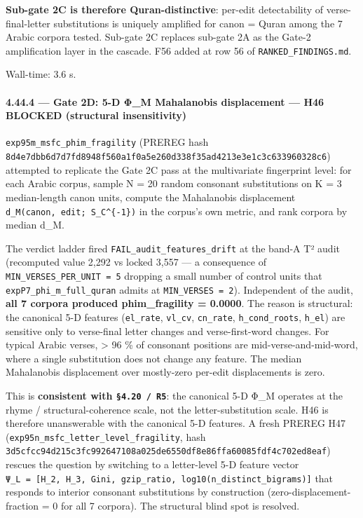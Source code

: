 \documentclass[
]{article}
\begin{document}
\textbf{Sub-gate 2C is therefore Quran-distinctive}: per-edit
detectability of verse-final-letter substitutions is uniquely amplified
for canon = Quran among the 7 Arabic corpora tested. Sub-gate 2C
replaces sub-gate 2A as the Gate-2 amplification layer in the cascade.
F56 added at row 56 of \texttt{RANKED\_FINDINGS.md}.

Wall-time: 3.6 s.

\paragraph{4.44.4 --- Gate 2D: 5-D Φ\_M Mahalanobis displacement --- H46
BLOCKED (structural
insensitivity)}\label{gate-2d-5-d-ux3c6_m-mahalanobis-displacement-h46-blocked-structural-insensitivity}

\texttt{exp95m\_msfc\_phim\_fragility} (PREREG hash
\texttt{8d4e7dbb6d7d7fd8948f560a1f0a5e260d338f35ad4213e3e1c3c633960328c6})
attempted to replicate the Gate 2C pass at the multivariate fingerprint
level: for each Arabic corpus, sample N = 20 random consonant
substitutions on K = 3 median-length canon units, compute the
Mahalanobis displacement \texttt{d\_M(canon,\ edit;\ S\_C\^{}\{-1\})} in
the corpus's own metric, and rank corpora by median d\_M.

The verdict ladder fired \texttt{FAIL\_audit\_features\_drift} at the
band-A T² audit (recomputed value 2,292 vs locked 3,557 --- a
consequence of \texttt{MIN\_VERSES\_PER\_UNIT\ =\ 5} dropping a small
number of control units that \texttt{expP7\_phi\_m\_full\_quran} admits
at \texttt{MIN\_VERSES\ =\ 2}). Independent of the audit, \textbf{all 7
corpora produced phim\_fragility = 0.0000}. The reason is structural:
the canonical 5-D features (\texttt{el\_rate}, \texttt{vl\_cv},
\texttt{cn\_rate}, \texttt{h\_cond\_roots}, \texttt{h\_el}) are
sensitive only to verse-final letter changes and verse-first-word
changes. For typical Arabic verses, \textgreater{} 96 \% of consonant
positions are mid-verse-and-mid-word, where a single substitution does
not change any feature. The median Mahalanobis displacement over
mostly-zero per-edit displacements is zero.

This is \textbf{consistent with \texttt{§4.20\ /\ R5}}: the canonical
5-D Φ\_M operates at the rhyme / structural-coherence scale, not the
letter-substitution scale. H46 is therefore unanswerable with the
canonical 5-D features. A fresh PREREG H47
(\texttt{exp95n\_msfc\_letter\_level\_fragility}, hash
\texttt{3d5cfcc94d215c3fc992647108a025de6550df8e86ffa60085fdf4c702ed8eaf})
rescues the question by switching to a letter-level 5-D feature vector
\texttt{Ψ\_L\ =\ {[}H\_2,\ H\_3,\ Gini,\ gzip\_ratio,\ log10(n\_distinct\_bigrams){]}}
that responds to interior consonant substitutions by construction
(zero-displacement-fraction = 0 for all 7 corpora). The structural blind
spot is resolved.
\end{document}

